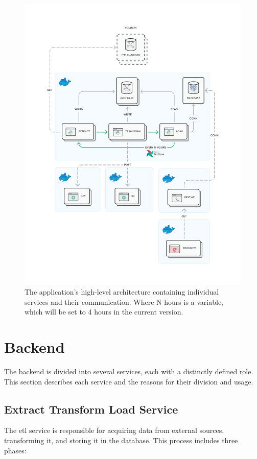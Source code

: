 \begin{figure}[htbp]
    \centering
    \includegraphics[width=\textwidth]{img/architecture/architecture-high.pdf}
    \caption{The application's high-level architecture containing individual services and their communication. Where N hours is a variable, which will be set to 4 hours in the current version.}
    \label{fig:architecture-high}
\end{figure}

\section{Backend}
\label{sec:architecture-backend}
The backend is divided into several services, each with a distinctly defined role. This section describes each service and the reasons for their division and usage.

\subsection{Extract Transform Load Service}
\label{subsec:architecture-etl}
The \acrshort{etl} service is responsible for acquiring data from external sources, transforming it, and storing it in the database. This process includes three phases:

